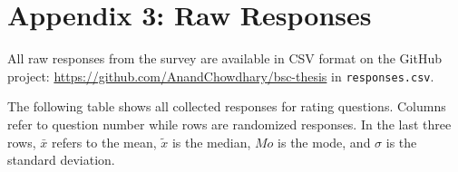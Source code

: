 \documentclass{article}
\begin{document}
\newpage

\section*{Appendix 3: Raw Responses}

All raw responses from the survey are available in CSV format on the GitHub project: \url{https://github.com/AnandChowdhary/bsc-thesis} in \texttt{responses.csv}.

The following table shows all collected responses for rating questions. Columns refer to question number while rows are randomized responses. In the last three rows, $\bar{x}$ refers to the mean, $\tilde{x}$ is the median, $Mo$ is the mode, and $\sigma$ is the standard deviation.

\vspace{10mm}
\end{document}
